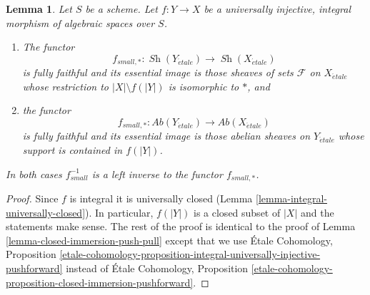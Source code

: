 \documentclass{stacks-project}
\theoremstyle{plain}
\newtheorem{lemma}[subsection]{Lemma}
\theoremstyle{definition}
\theoremstyle{remark}
\numberwithin{equation}{subsection}
\def\Sh{\mathop{\mathit{Sh}}\nolimits}
\def\etale{{\acute{e}tale}}
\begin{document}
\begin{lemma}
\label{lemma-integral-universally-injective-push-pull}
Let $S$ be a scheme. Let $f : Y \to X$ be a universally injective,
integral morphism of algebraic spaces over $S$.
\begin{enumerate}
\item The functor
$$
f_{small, *} : \Sh(Y_\etale) \longrightarrow \Sh(X_\etale)
$$
is fully faithful and its essential image is those sheaves of sets
$\mathcal{F}$ on $X_\etale$ whose restriction to $|X| \setminus f(|Y|)$
is isomorphic to $*$, and
\item the functor
$$
f_{small, *} : \textit{Ab}(Y_\etale) \longrightarrow \textit{Ab}(X_\etale)
$$
is fully faithful and its essential image is those abelian sheaves on
$Y_\etale$ whose support is contained in $f(|Y|)$.
\end{enumerate}
In both cases $f_{small}^{-1}$ is a left inverse to the functor $f_{small, *}$.
\end{lemma}

\begin{proof}
Since $f$ is integral it is universally closed
(Lemma \ref{lemma-integral-universally-closed}).
In particular, $f(|Y|)$ is a closed subset of $|X|$
and the statements make sense.
The rest of the proof is identical to the proof of
Lemma \ref{lemma-closed-immersion-push-pull}
except that we use
\'Etale Cohomology, Proposition
\ref{etale-cohomology-proposition-integral-universally-injective-pushforward}
instead of
\'Etale Cohomology, Proposition
\ref{etale-cohomology-proposition-closed-immersion-pushforward}.
\end{proof}



























\end{document}
